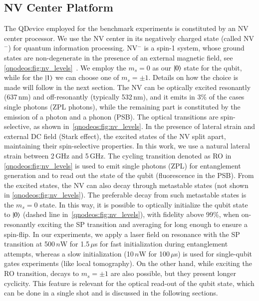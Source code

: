 \subsection{NV Center Platform}
\label{qnodeos:sec:qdevice-nv}

The \ac{QDevice} employed for the benchmark experiments is constituted by an \ac{NV} center processor. We use the \ac{NV} center in its negatively charged state (called \ac{NV}$^-$) for quantum information processing. \ac{NV}$^-$ is a spin-1 system, whose ground states are non-degenerate in the presence of an external magnetic field, see \cref{qnodeos:fig:nv_levels}~\cite{doherty_2013}. We employ the $m_s=0$ as our $\ket{0}$ state for the qubit, while for the $\ket{1}$ we can choose one of $m_s=\pm 1$. Details on how the choice is made will follow in the next section. The \ac{NV} can be optically excited resonantly (637\,nm) and off-resonantly (typically 532\,nm), and it emits in 3\% of the cases single photons (\ac{ZPL} photons), while the remaining part is constituted by the emission of a photon and a phonon (\ac{PSB}). The optical transitions are spin-selective, as shown in~\cref{qnodeos:fig:nv_levels}. In the presence of lateral strain and external DC field (Stark effect), the excited states of the \ac{NV} split apart, maintaining their spin-selective properties. In this work, we use a natural lateral strain between 2\,GHz and 5\,GHz. The cycling transition denoted as \ac{RO} in \cref{qnodeos:fig:nv_levels} is used to emit single photons (\ac{ZPL}) for entanglement generation and to read out the state of the qubit (fluorescence in the \ac{PSB}). From the excited states, the \ac{NV} can also decay through metastable states (not shown in \cref{qnodeos:fig:nv_levels}). The preferable decay from such metastable states is the $m_s=0$ state. In this way, it is possible to optically initialize the qubit state to $\ket{0}$ (dashed line in~\cref{qnodeos:fig:nv_levels}), with fidelity above 99\%, when on-resonantly exciting the \ac{SP} transition and averaging for long enough to ensure a spin-flip. In our experiments, we apply a laser field on resonance with the \ac{SP} transition at 500\,$n$W for 1.5\,$\mu$s for fast initialization during entanglement attempts, whereas a slow initialization (10\,$n$W for 100\,$\mu$s) is used for single-qubit gates experiments (like local tomography). On the other hand, while exciting the \ac{RO} transition, decays to $m_s=\pm 1$ are also possible, but they present longer cyclicity. This feature is relevant for the optical read-out of the qubit state, which can be done in a single shot and is discussed in the following sections.

